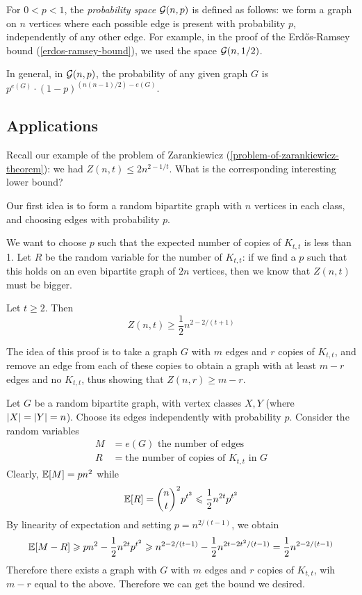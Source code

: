 \documentclass{article}
\begin{document}
\begin{definition}
    For $0 < p < 1$, the \textit{probability space} $\mathcal{G}(n,p)$ is defined as follows: we form a graph on $n$ vertices where each possible edge is present with probability $p$, independently of any other edge. For example, in the proof of the Erd{\H o}s-Ramsey bound (\ref{erdos-ramsey-bound}), we used the space $\mathcal{G}(n, 1/2)$.
\end{definition}

In general, in $\mathcal{G}(n, p)$, the probability of any given graph $G$ is $p^{e(G)} \cdot (1-p)^{(n(n-1)/2) - e(G)}$.


\subsection{Applications}

Recall our example of the problem of Zarankiewicz (\ref{problem-of-zarankiewicz-theorem}): we had $Z(n, t) \leq 2 n^{2 - 1/t}$. What is the corresponding interesting lower bound?

Our first idea is to form a random bipartite graph with $n$ vertices in each class, and choosing edges with probability $p$.

We want to choose $p$ such that the expected number of copies of $K_{t,t}$ is less than 1. Let $R$ be the random variable for the number of $K_{t,t}$: if we find a $p$ such that this holds on an even bipartite graph of $2n$ vertices, then we know that $Z(n, t)$ must be bigger.

\begin{theorem}
    Let $t \geq 2$. Then
    \[
	Z(n, t) \geq \frac{1}{2}n^{2 - 2/(t+1)}
	\]
\end{theorem}

\begin{prf}
    The idea of this proof is to take a graph $G$ with $m$ edges and $r$ copies of $K_{t,t}$, and remove an edge from each of these copies to obtain a graph with at least $m-r$ edges and no $K_{t,t}$, thus showing that $Z(n, r) \geq m - r$.
    
    Let $G$ be a random bipartite graph, with vertex classes $X, Y$ (where $\left\lvert X \right\rvert = \left\lvert Y \right\rvert = n$). Choose its edges independently with probability $p$. Consider the random variables
    \begin{align*}
    	M &= e(G) \text{ the number of edges} \\
    	R &= \text{the number of copies of $K_{t,t}$ in $G$}
	\end{align*}
	Clearly, $\mathbb{E}[M] = pn^2$ while
	\[
	\mathbb{E}[R] = \binom{n}{t}^2 p^{t^2} \leqslant \frac{1}{2}n^{2t}p^{t^2}
	\]
	By linearity of expectation and setting $p = n^{2/(t-1)}$, we obtain
	\[
	\mathbb{E}[M - R] \geqslant pn^2 - \frac{1}{2}n^{2t}p^{t^2} \geqslant n^{2 - 2/(t-1)} - \frac{1}{2} n^{2t - 2t^2/(t-1)} = \frac{1}{2} n^{2 - 2/(t-1)}
	\]
	Therefore there exists a graph with $G$ with $m$ edges and $r$ copies of $K_{t,t}$, wih $m - r$ equal to the above. Therefore we can get the bound we desired.
\end{prf}
\end{document}
